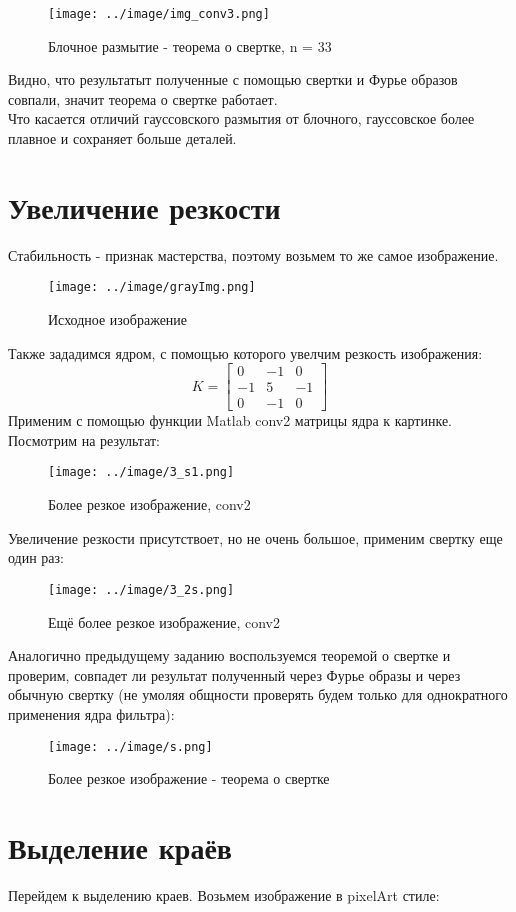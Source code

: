 \begin{figure}[!htb]
    \centering
    \texttt{[image: ../image/img\_conv3.png]}   
    \caption{Блочное размытие - теорема о свертке, n = 33}
\end{figure}
\noindent Видно, что результатыт полученные с помощью свертки и Фурье образов совпали, значит теорема о свертке работает.
\\
\noindent Что касается отличий гауссовского размытия от блочного, гауссовское более плавное и сохраняет больше деталей.
\section{Увеличение резкости}
\noindent Стабильность - признак мастерства, поэтому возьмем то же самое изображение.
\begin{figure}[!htb]
    \centering
    \texttt{[image: ../image/grayImg.png]}   
    \caption{Исходное изображение}
\end{figure}
\newpage
Также зададимся ядром, с помощью которого увелчим резкость изображения:
$$
K
= 
\begin{bmatrix}
    0 & -1 & 0\\
    -1 & 5 & -1\\
    0 & -1 & 0
\end{bmatrix}
$$
Применим с помощью функции Matlab conv2 матрицы ядра к картинке. Посмотрим на результат: 
\begin{figure}[!htb]
    \centering
    \texttt{[image: ../image/3\_s1.png]}   
    \caption{Более резкое изображение, conv2}
\end{figure}
\newpage
\noindent Увеличение резкости присутствоет, но не очень большое, применим свертку еще один раз:
\begin{figure}[!htb]
    \centering
    \texttt{[image: ../image/3\_2s.png]}   
    \caption{Ещё более резкое изображение, conv2}
\end{figure}
\newpage
\noindent Аналогично предыдущему заданию воспользуемся теоремой о свертке и проверим, совпадет ли результат полученный через Фурье образы и через обычную свертку (не умоляя общности проверять будем только для однократного применения ядра фильтра):
\begin{figure}[!htb]
    \centering
    \texttt{[image: ../image/s.png]}   
    \caption{Более резкое изображение - теорема о свертке}
\end{figure}
\section{Выделение краёв}
\noindent Перейдем к выделению краев. Возьмем изображение в pixelArt  стиле:

